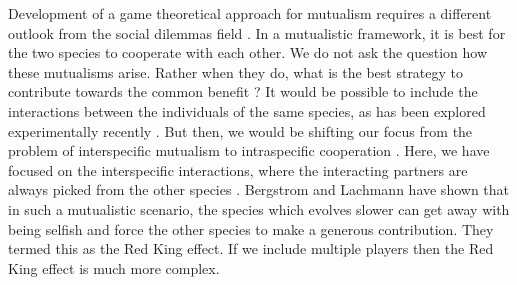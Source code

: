 \documentclass[a4paper]{scrartcl}
\begin{document}
Development of a game theoretical approach for mutualism requires a different outlook from the social dilemmas field \citep{bshary:2004aa}.
In a mutualistic framework, it is best for the two species to cooperate with each other.
We do not ask the question how these mutualisms arise. 
Rather when they do, what is the best strategy to contribute towards the common benefit \citep{bshary:2003bo,bowles:2003uw}?
It would be possible to include the interactions between the individuals of the same species, as has been explored experimentally recently \citep{wang:2011aa}.
But then, we would be shifting our focus from the problem of interspecific mutualism to intraspecific cooperation \citep{bshary:2008aa}.
Here, we have focused on the interspecific interactions, where the interacting partners are always picked from the other species \citep{schuster:1981aa}.
Bergstrom and Lachmann have shown that in such a mutualistic scenario, the species which evolves slower can get away with being selfish and force the other species to make a generous contribution.
They termed this as the Red King effect.
If we include multiple players then the Red King effect is much more complex.
\end{document}
